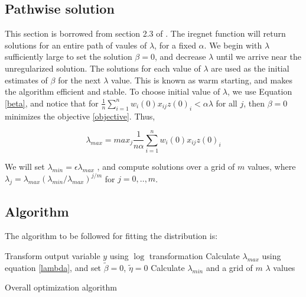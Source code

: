 \documentclass[12pt,a4paper]{report}
\begin{document}
\subsection*{Pathwise solution}
This section is borrowed from section 2.3 of \cite{a3}.
The iregnet function will return solutions for an entire path of vaules of $\lambda$, for a fixed $\alpha$.
We begin with $\lambda$ sufficiently large to set the solution $\beta = 0$, and decrease $\lambda$ until we arrive
near the unregularized solution. The solutions for each value of $\lambda$ are used as the initial
estimates of $\beta$ for the next $\lambda$ value. This is known as warm starting, and makes the algorithm efficient and stable.
To choose initial value of $\lambda$, we use Equation \ref{beta}, and notice that for $\frac{1}{n} \sum_{i=1}^n w_i(0) x_{ij} z(0)_i < \alpha \lambda$ for all $j$, then $\beta = 0$ minimizes the objective \ref{objective}. Thus,

\begin{equation} \label{lambda}
\lambda_{max} = max_j \frac{1}{n \alpha} \sum_{i=1}^n w_i(0) x_{ij} z(0)_i
\end{equation}

We will set $\lambda_{min} = \epsilon \lambda_{max}$ , and compute solutions over a grid of $m$ values, where $\lambda_j = \lambda_{max}(\lambda_{min} / \lambda_{max})^{j/m}$ for $j = 0, .., m$.

\subsection*{Algorithm}
The algorithm to be followed for fitting the distribution is:

\begin{algorithm}[H]
\SetAlgoLined
 Transform output variable $y$ using $\log$ transformation \;
 Calculate $\lambda_{max}$ using equation \ref{lambda}, and set $\widetilde{\beta} = 0$, $\widetilde{\eta}=0$ \;
 Calculate $\lambda_{min}$ and a grid of $m$ $\lambda$ values \;
 \caption{Overall optimization algorithm}
\end{algorithm}
\end{document}
